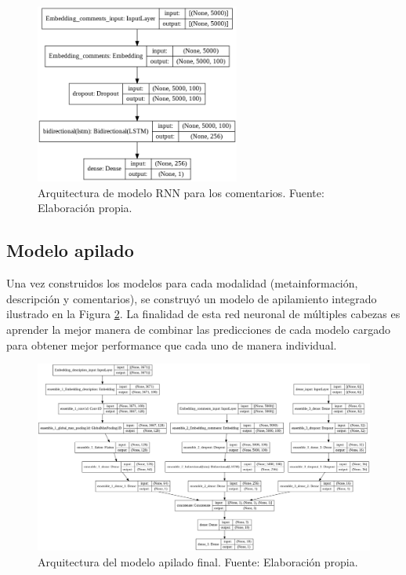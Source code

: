 \begin{figure}[!ht]
	\begin{center}
		\includegraphics[width=0.60\textwidth]{4/figures/model_rnn_comments.png}
		\caption{Arquitectura de modelo RNN para los comentarios. Fuente: Elaboración propia.}
		\label{4:fig40}
	\end{center}
\end{figure}

\subsection{Modelo apilado}
Una vez construidos los modelos para cada modalidad (metainformación, descripción y comentarios), se construyó un modelo de apilamiento integrado ilustrado en la Figura \ref{4:fig41}. La finalidad de esta red neuronal de múltiples cabezas es aprender la mejor manera de combinar las predicciones de cada modelo cargado para obtener mejor performance que cada uno de manera individual.

\begin{figure}[!ht]
	\begin{center}
		\includegraphics[width=1.05\textwidth]{4/figures/final_stacked_model.png}
		\caption{Arquitectura del modelo apilado final. Fuente: Elaboración propia.}
		\label{4:fig41}
	\end{center}
\end{figure}

